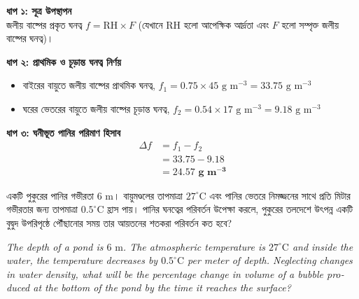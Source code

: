 \documentclass[12pt, a4paper]{article}
\begin{document}
\begin{tcolorbox}[solutionbox={সমাধান (Solution)}]
    \noindent
    \textbf{ধাপ ১: সূত্র উপস্থাপন} \\
    জলীয় বাষ্পের প্রকৃত ঘনত্ব $f = \text{RH} \times F$ (যেখানে $\text{RH}$ হলো আপেক্ষিক আর্দ্রতা এবং $F$ হলো সম্পৃক্ত জলীয় বাষ্পের ঘনত্ব)।
    
    \vspace{0.4em}
    \noindent\textbf{ধাপ ২: প্রাথমিক ও চূড়ান্ত ঘনত্ব নির্ণয়}
    \begin{itemize}[leftmargin=1.5em, itemsep=0.2em]
        \item বাইরের বায়ুতে জলীয় বাষ্পের প্রাথমিক ঘনত্ব, $f_1 = 0.75 \times 45\text{ g m}^{-3} = 33.75\text{ g m}^{-3}$
        \item ঘরের ভেতরের বায়ুতে জলীয় বাষ্পের চূড়ান্ত ঘনত্ব, $f_2 = 0.54 \times 17\text{ g m}^{-3} = 9.18\text{ g m}^{-3}$
    \end{itemize}
    
    \vspace{0.4em}
    \noindent\textbf{ধাপ ৩: ঘনীভূত পানির পরিমাণ হিসাব}
    \begin{align*}
        \Delta f &= f_1 - f_2 \\
        &= 33.75 - 9.18 \\
        &= \mathbf{24.57\text{ g m}^{-3}}
    \end{align*}
\end{tcolorbox}

\vspace{2em}

\begin{tcolorbox}[questionbox={প্রশ্ন (Question) 5}]
    \noindent
    একটি পুকুরের পানির গভীরতা $6\text{ m}$। বায়ুমণ্ডলের তাপমাত্রা $27^\circ\text{C}$ এবং পানির ভেতরে নিমজ্জনের সাথে প্রতি মিটার গভীরতার জন্য তাপমাত্রা $0.5^\circ\text{C}$ হ্রাস পায়। পানির ঘনত্বের পরিবর্তন উপেক্ষা করলে, পুকুরের তলদেশে উৎপন্ন একটি বুদ্বুদ উপরিপৃষ্ঠে পৌঁছানোর সময় তার আয়তনের শতকরা পরিবর্তন কত হবে?
    
    \vspace{0.8em}
    \begin{english}
    \noindent\textit{\color{darkgray}
    The depth of a pond is $6\text{ m}$. The atmospheric temperature is $27^\circ\text{C}$ and inside the water, the temperature decreases by $0.5^\circ\text{C}$ per meter of depth. Neglecting changes in water density, what will be the percentage change in volume of a bubble produced at the bottom of the pond by the time it reaches the surface?
    }
    \end{english}
\end{tcolorbox}
\end{document}

